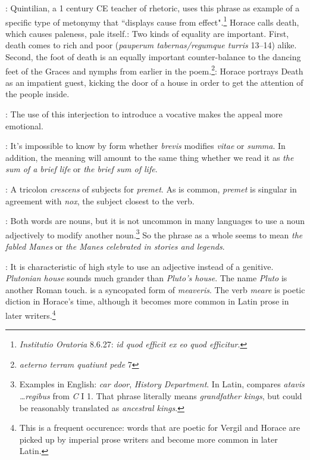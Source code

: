 
: Quintilian, a 1 century CE teacher of rhetoric, uses this phrase as example of a specific type of metonymy that ``displays cause from effect".\footnote{\textit{Institutio Oratoria} 8.6.27: \textit{id quod efficit ex eo quod efficitur}.}  Horace calls death, which causes paleness, pale itself.\indent{}: Two kinds of equality are important. First, death comes to rich and poor (\textit{pauperum tabernas/regumque turris} 13--14) alike.  Second, the foot of death is an equally important counter-balance to the dancing feet of the Graces and nymphs from earlier in the poem.\footnote{\textit{aeterno terram quatiunt pede} 7}\indent{}: Horace portrays Death as an impatient guest, kicking the door of a house in order to get the attention of the people inside.


: The use of this interjection to introduce a vocative makes the appeal more emotional.


: It's impossible to know by form whether \textit{brevis} modifies \textit{vitae} or \textit{summa}.  In addition, the meaning will amount to the same thing whether we read it as \textit{the sum of a brief life} or \textit{the brief sum of life}.


: A tricolon \textit{crescens} of subjects for \textit{premet}.  As is common, \textit{premet} is singular in agreement with \textit{nox}, the subject closest to the verb.


: Both words are nouns, but it is not uncommon in many languages to use a noun adjectively to modify another noun.\footnote{Examples in English: \textit{car door}, \textit{History Department}. In Latin, \citet[84]{mayer2012} compares \textit{atavis \dots regibus} from \textit{C} I 1.  That phrase literally means \textit{grandfather kings}, but could be reasonably translated as \textit{ancestral kings}.}  So the phrase as a whole seems to mean \textit{the fabled Manes} or \textit{the Manes celebrated in stories and legends}.


: It is characteristic of high style to use an adjective instead of a genitive.  \textit{Plutonian house} sounds much grander than \textit{Pluto's house}.  The name \textit{Pluto} is another Roman touch.\indent{} is a syncopated form of \textit{meaveris}.  The verb \textit{meare} is poetic diction in Horace's time, although it becomes more common in Latin prose in later writers.\footnote{This is a frequent occurence: words that are poetic for Vergil and Horace are picked up by imperial prose writers and become more common in later Latin.}

